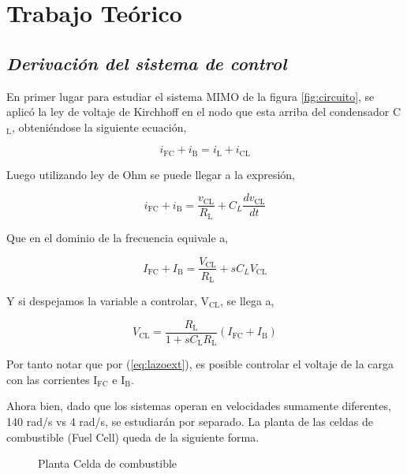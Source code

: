 \section{Trabajo Teórico}

\subsection{\textit{Derivación del sistema de control}}
En primer lugar para estudiar el sistema MIMO de la figura \ref{fig:circuito}, se aplicó 
la ley de voltaje de Kirchhoff en el nodo que esta arriba del condensador C$_{\text{L}}$, 
obteniéndose la siguiente ecuación,

\begin{equation}
    i_{\text{FC}} + i_{\text{B}} = i_{\text{L}} + i_{\text{CL}}
\end{equation}

Luego utilizando ley de Ohm se puede llegar a la expresión,

\begin{equation}
    i_{\text{FC}} + i_{\text{B}} = \frac{v_{\text{CL}}}{R_{\text{L}}} + C_{L}\frac{dv_{\text{CL}}}{dt}
\end{equation}

Que en el dominio de la frecuencia equivale a,

\begin{equation}
    I_{\text{FC}} + I_{\text{B}} = \frac{V_{\text{CL}}}{R_{\text{L}}} + sC_{L}V_{\text{CL}}
\end{equation}

Y si despejamos la variable a controlar, V$_{\text{CL}}$, se llega a,

\begin{equation}
    V_{\text{CL}} = \frac{R_{\text{L}}}{1+sC_{\text{L}}R_{\text{L}}}(I_{\text{FC}}+I_{\text{B}})
    \label{eq:lazoext}
\end{equation}

Por tanto notar que por (\ref{eq:lazoext}), es posible controlar el voltaje de la carga 
con las corrientes I$_{\text{FC}}$ e I$_{\text{B}}$.

Ahora bien, dado que los sistemas operan en velocidades sumamente diferentes, 140 rad/s vs 4 rad/s,
se estudiarán por separado. La planta de las celdas de combustible (Fuel Cell) queda de la siguiente 
forma.
\begin{figure}[H] %
    \centering
    \caption{Planta Celda de combustible}
    \label{circ:planta_fc}
\end{figure}

